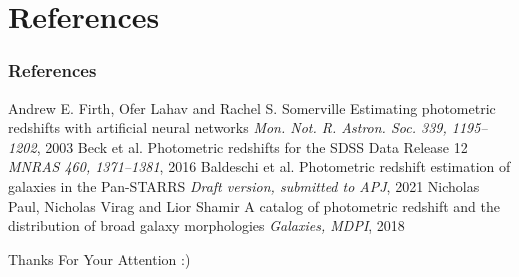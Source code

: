 \documentclass{beamer}
\begin{document}
\section{References}
\begin{frame}
\frametitle{References}
\footnotesize{
\begin{thebibliography}{99} %
 Andrew E. Firth, Ofer Lahav and Rachel S. Somerville
\newblock Estimating photometric redshifts with artificial neural networks
\newblock \emph{Mon. Not. R. Astron. Soc. 339, 1195–1202}, 2003
 Beck et al.
\newblock Photometric redshifts for the SDSS Data Release 12
\newblock \emph{MNRAS 460, 1371–1381}, 2016
 Baldeschi et al.
\newblock Photometric redshift estimation of galaxies in the Pan-STARRS
\newblock \emph{Draft version, submitted to APJ}, 2021
 Nicholas Paul, Nicholas Virag and Lior Shamir
\newblock A catalog of photometric redshift and the distribution of broad galaxy morphologies
\newblock \emph{Galaxies, MDPI}, 2018
\end{thebibliography}
}
\end{frame}


\begin{frame}
\Huge{\centerline{Thanks For Your Attention :)}}
\end{frame}

\end{document}
